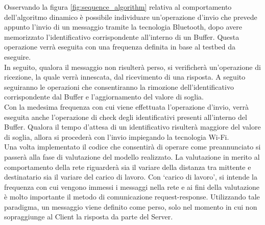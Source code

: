 \noindent Osservando la figura \ref{fig:sequence_algorithm} relativa al comportamento dell'algoritmo dinamico è possibile individuare un'operazione d'invio che prevede appunto l'invio di un messaggio tramite la tecnologia Bluetooth, dopo avere memorizzato l'identificativo corrispondente all'interno di un Buffer. Questa operazione verrà eseguita con una frequenza definita in base al testbed da eseguire. \\
In seguito, qualora il messaggio non risulterà perso, si verificherà un'operazione di ricezione, la quale verrà innescata, dal ricevimento di una risposta. A seguito seguiranno le operazioni che consentiranno la rimozione dell'identificativo corrispondente dal Buffer e l'aggiornamento del valore di soglia.\\
Con la medesima frequenza con cui viene effettuata l'operazione d'invio, verrà eseguita anche l'operazione di check degli identificativi presenti all'interno del Buffer. Qualora il tempo d'attesa di un identificativo risulterà maggiore del valore di soglia, allora si procederà con l'invio impiegando la tecnologia Wi-Fi.\\

\noindent Una volta implementato il codice che consentirà di operare come preannunciato si passerà alla fase di valutazione del modello realizzato. La valutazione in merito al comportamento della rete riguarderà sia il variare della distanza tra mittente e destinatario sia il variare del carico di lavoro. Con `carico di lavoro', si intende la frequenza con cui vengono immessi i messaggi nella rete e ai fini della valutazione è molto importante il metodo di comunicazione request-response. Utilizzando tale paradigma, un messaggio viene definito come perso, solo nel momento in cui non sopraggiunge al Client la risposta da parte del Server.


